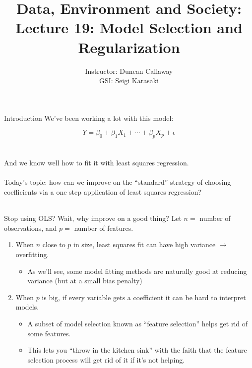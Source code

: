 \documentclass[mathserif, aspectratio=169]{beamer}
\title[Lecture 19] %
{Data, Environment and Society: \\{Lecture 19: Model Selection and Regularization}}
\author[ER190C: Data, Environment and Society] 
{Instructor: Duncan Callaway\\
GSI: Seigi Karasaki}
\institute[UC Berkeley] %
 {\small{ \bf October 25, 2018}}
\date[October 25, 2018]
\begin{document}
\frame{
  \titlepage
}

\begin{frame}{Introduction}
We've been working a lot with this model:

\begin{equation*}
Y = \beta_0+\beta_1X_1+\cdots+\beta_pX_p+\epsilon
\end{equation*}\\~\\
And we know well how to fit it with least squares regression.\\~\\

Today's topic: how can we improve on the ``standard'' strategy of choosing coefficients via a one step application of least squares regression?\\~\\
\end{frame}

\begin{frame}{Stop using OLS?  Wait, why improve on a good thing?}
Let $n=$ number of observations, and $p=$ number of features.
 \begin{enumerate}
\item When $n$ close to $p$ in size, least squares fit can have high variance $\rightarrow$ overfitting.
\begin{itemize}
\item As we'll see, some model fitting methods are naturally good at reducing variance (but at a small bias penalty)
\end{itemize}
\item When $p$ is big, if every variable gets a coefficient it can be hard to interpret models.  
\begin{itemize}
\item A subset of model selection known as ``feature selection'' helps get rid of some features.
\item This lets you ``throw in the kitchen sink'' with the faith that the feature selection process will get rid of it if it's not helping.
\end{itemize}
\end{enumerate}
\end{frame}
\end{document}
